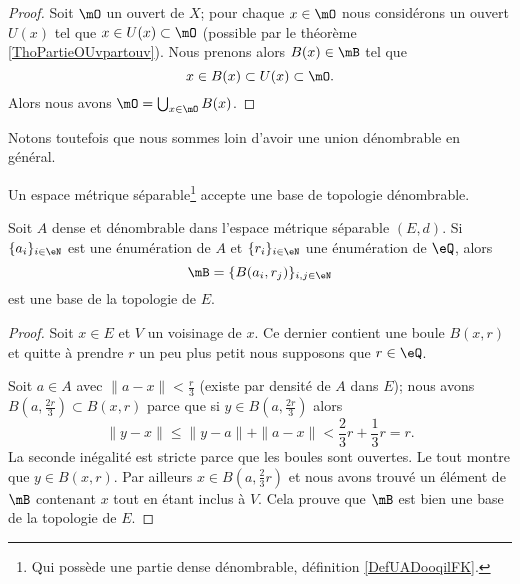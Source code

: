 \begin{proof}
    Soit \( \mO\) un ouvert de \( X\); pour chaque \( x\in\mO\) nous considérons un ouvert \( U(x)\) tel que \( x\in U(x)\subset \mO\) (possible par le théorème \ref{ThoPartieOUvpartouv}). Nous prenons alors \( B(x)\in\mB\) tel que 
    \begin{equation}
        x\in B(x)\subset U(x)\subset \mO.
    \end{equation}
    Alors nous avons \( \mO=\bigcup_{x\in \mO}B(x)\).
\end{proof}
Notons toutefois que nous sommes loin d'avoir une union dénombrable en général.

\begin{proposition} \label{PropNBSooraAFr}
    Un espace métrique séparable\footnote{Qui possède une partie dense dénombrable, définition \ref{DefUADooqilFK}.} accepte une base de topologie dénombrable.

     Soit \( A\) dense et dénombrable dans l'espace métrique séparable \( (E,d)\). Si \( \{ a_i \}_{i\in \eN}\) est une énumération de \( A\) et \( \{ r_i \}_{i\in \eN}\) une énumération de \( \eQ\), alors
    \begin{equation}
        \mB=\{ B(a_i,r_j) \}_{i,j\in \eN}
    \end{equation}
    est une base de la topologie de \( E\). 
\end{proposition}

\begin{proof}
    Soit \( x\in E\) et \( V\) un voisinage de \( x\). Ce dernier contient une boule \( B(x,r)\) et quitte à prendre \( r\) un peu plus petit nous supposons que \( r\in \eQ\).

    Soit \( a\in A\) avec \( \| a-x \|<\frac{ r }{ 3 }\) (existe par densité de \( A\) dans \( E\)); nous avons \( B(a,\frac{ 2r }{ 3 })\subset B(x,r)\) parce que si \( y\in B( a,\frac{ 2r }{ 3 } )\) alors
    \begin{equation}
        \| y-x \|\leq \| y-a \|+\| a-x \|<\frac{ 2 }{ 3 }r+\frac{ 1 }{ 3 }r=r.
    \end{equation}
    La seconde inégalité est stricte parce que les boules sont ouvertes. Le tout montre que \( y\in B(x,r)\). Par ailleurs \( x\in B(a,\frac{ 2 }{ 3 }r)\) et nous avons trouvé un élément de \( \mB\) contenant \( x\) tout en étant inclus à \( V\). Cela prouve que \( \mB\) est bien une base de la topologie de \( E\).
\end{proof}

